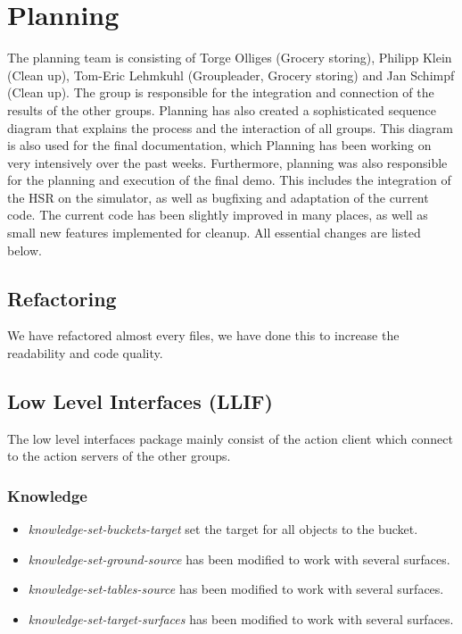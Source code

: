 \documentclass[main.tex]{subfiles}
\begin{document}
	
	\chapter{Planning}
                The planning team is consisting of Torge Olliges (Grocery storing), Philipp Klein (Clean up), Tom-Eric Lehmkuhl (Groupleader, Grocery storing) and Jan Schimpf (Clean up). The group is responsible for the integration and connection of the results of the other groups. Planning has also created a sophisticated sequence diagram that explains the process and the interaction of all groups. This diagram is also used for the final documentation, which Planning has been working on very intensively over the past weeks. Furthermore, planning was also responsible for the planning and execution of the final demo. This includes the integration of the HSR on the simulator, as well as bugfixing and adaptation of the current code. The current code has been slightly improved in many places, as well as small new features implemented for cleanup. All essential changes are listed below. 
          
          		\section{Refactoring}
	        	    We have refactored almost every files, we have done this to increase the readability and code quality.   
	        	    
	        	\section{Low Level Interfaces (LLIF)}
	                The low level interfaces package mainly consist of the action client which connect to the action servers of the other groups.
                
               
                \subsection{Knowledge}
	                
				    \begin{itemize}
				      \item \textit{knowledge-set-buckets-target} set the target for all objects to the bucket.
				       \item \textit{knowledge-set-ground-source} has been modified to work with several surfaces. 
				       \item \textit{knowledge-set-tables-source} has been modified to work with several surfaces. 
				       \item \textit{knowledge-set-target-surfaces} has been modified to work with several surfaces.
		
				    \end{itemize} 
                                           
\end{document}
